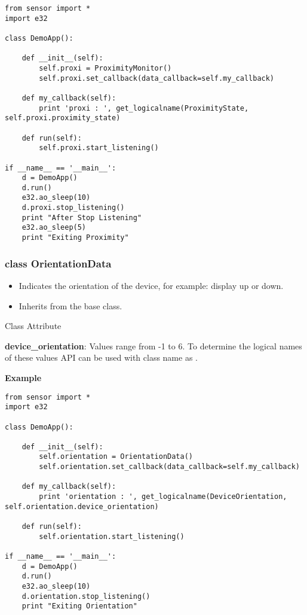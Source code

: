 \begin{verbatim}
from sensor import *
import e32

class DemoApp():

    def __init__(self):
        self.proxi = ProximityMonitor()
        self.proxi.set_callback(data_callback=self.my_callback)

    def my_callback(self):
        print 'proxi : ', get_logicalname(ProximityState, self.proxi.proximity_state)

    def run(self):
        self.proxi.start_listening()

if __name__ == '__main__':
    d = DemoApp()
    d.run()
    e32.ao_sleep(10)
    d.proxi.stop_listening()
    print "After Stop Listening"
    e32.ao_sleep(5)
    print "Exiting Proximity"
\end{verbatim}

\subsubsection{class OrientationData}

\begin{itemize}
\item Indicates the orientation of the device, for example: display up or down.
\item Inherits from the  base class.
\end{itemize}

{Class Attribute} \break

{\bf device_orientation}: Values range from -1 to 6. To determine the logical names of these values  API can be used with class name as .

{\bf Example} \break

\begin{verbatim}
from sensor import *
import e32

class DemoApp():

    def __init__(self):
        self.orientation = OrientationData()
        self.orientation.set_callback(data_callback=self.my_callback)

    def my_callback(self):
        print 'orientation : ', get_logicalname(DeviceOrientation, self.orientation.device_orientation)

    def run(self):
        self.orientation.start_listening()

if __name__ == '__main__':
    d = DemoApp()
    d.run()
    e32.ao_sleep(10)
    d.orientation.stop_listening()
    print "Exiting Orientation"
\end{verbatim}

